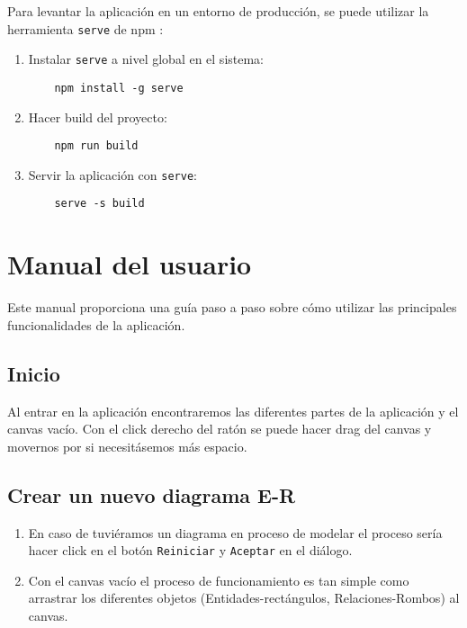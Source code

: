 Para levantar la aplicación en un entorno de producción, se puede utilizar la herramienta \texttt{serve} de npm \cite{npm:serve}:
\begin{enumerate}
    \item Instalar \texttt{serve} a nivel global en el sistema:
    \begin{verbatim}
    npm install -g serve
    \end{verbatim}
    \item Hacer build del proyecto:
    \begin{verbatim}
    npm run build
    \end{verbatim}
    \item Servir la aplicación con \texttt{serve}:
    \begin{verbatim}
    serve -s build
    \end{verbatim}
\end{enumerate}

\section{Manual del usuario}
Este manual proporciona una guía paso a paso sobre cómo utilizar las principales funcionalidades de la aplicación.

\subsection{Inicio}
Al entrar en la aplicación encontraremos las diferentes partes de la aplicación y el canvas vacío.
Con el click derecho del ratón se puede hacer drag del canvas y movernos por si necesitásemos más espacio.



\subsection{Crear un nuevo diagrama E-R}
\begin{enumerate}
    \item En caso de tuviéramos un diagrama en proceso de modelar el proceso sería hacer click en el botón \texttt{Reiniciar} y \texttt{Aceptar} en el diálogo.
    \item Con el canvas vacío el proceso de funcionamiento es tan simple como arrastrar los diferentes objetos (Entidades-rectángulos, Relaciones-Rombos) al canvas.
\end{enumerate}

